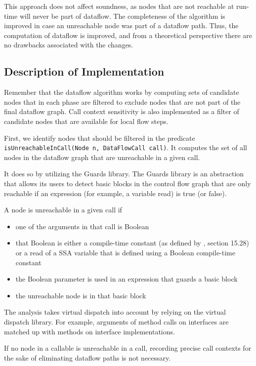 This approach does not affect soundness,
as nodes that are not reachable at run-time will never be part of dataflow.
The completeness of the algorithm
is improved in case an unreachable node was part of a dataflow path.
Thus, the computation of dataflow is improved, and from a theoretical perspective 
there are no drawbacks associated with the changes.

\subsection{Description of Implementation}
Remember that the dataflow algorithm works by computing sets of candidate nodes that 
in each phase are filtered to exclude nodes that are not part of the final dataflow graph.
Call context sensitivity is also implemented as a filter of candidate nodes
that are available for local flow steps.

First, we identify nodes that should be filtered in the
predicate \texttt{isUnreachableInCall(Node n, DataFlowCall call)}.
It computes the set of all nodes in the dataflow graph that are unreachable
in a given call.

It does so by utilizing the Guards library.
The Guards library is an abstraction that allows its users to detect 
basic blocks in the control flow graph that are only reachable if an 
expression (for example, a variable read) is true (or false).

A node is unreachable in a given call if
\begin{itemize}
    \item one of the arguments in that call is Boolean
    \item that Boolean is either a compile-time constant (as defined by \cite{jls}, section 15.28)
    or a read of a SSA variable that is defined using a Boolean compile-time constant
    \item the Boolean parameter is used in an expression that guards a basic block
    \item the unreachable node is in that basic block
\end{itemize}
The analysis takes virtual dispatch into account by relying on the virtual
dispatch library.
For example, 
arguments of method calls on interfaces are matched up with methods 
on interface implementations.

If no node in a callable is unreachable in a call, 
recording precise call contexts for the sake of eliminating dataflow paths 
is not necessary.

